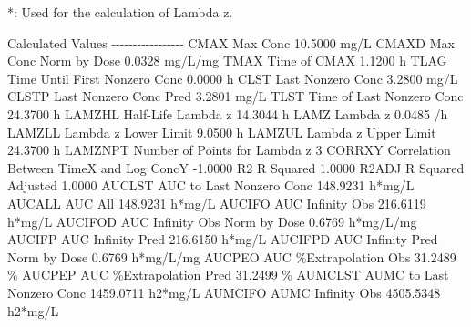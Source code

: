 \documentclass[
  10pt,
]{krantz}
\makeatletter
\newenvironment{Shaded}{\begin{snugshade}}{\end{snugshade}}
\newcommand{\ExtensionTok}[1]{#1}
\newcommand{\NormalTok}[1]{#1}
\newenvironment{kframe}{%
\medskip{}
\setlength{\fboxsep}{.8em}
 \def\at@end@of@kframe{}%
 \ifinner\ifhmode%
  \def\at@end@of@kframe{\end{minipage}}%
  \begin{minipage}{\columnwidth}%
 \fi\fi%
 \def\FrameCommand##1{\hskip\@totalleftmargin \hskip-\fboxsep
 \colorbox{shadecolor}{##1}\hskip-\fboxsep
     \hskip-\linewidth \hskip-\@totalleftmargin \hskip\columnwidth}%
 \MakeFramed {\advance\hsize-\width
   \@totalleftmargin\z@ \linewidth\hsize
   \@setminipage}}%
 {\par\unskip\endMakeFramed%
 \at@end@of@kframe}
\renewenvironment{Shaded}{\begin{kframe}}{\end{kframe}}
\makeatother
\begin{document}
\begin{Shaded}
\begin{Highlighting}[]
\ExtensionTok{*}\NormalTok{: Used for the calculation of Lambda z.}


\ExtensionTok{Calculated}\NormalTok{ Values}
\ExtensionTok{{-}{-}{-}{-}{-}{-}{-}{-}{-}{-}{-}{-}{-}{-}{-}{-}{-}}
\ExtensionTok{CMAX}\NormalTok{       Max Conc                                       10.5000 mg/L}
\ExtensionTok{CMAXD}\NormalTok{      Max Conc Norm by Dose                           0.0328 mg/L/mg}
\ExtensionTok{TMAX}\NormalTok{       Time of CMAX                                    1.1200 h}
\ExtensionTok{TLAG}\NormalTok{       Time Until First Nonzero Conc                   0.0000 h}
\ExtensionTok{CLST}\NormalTok{       Last Nonzero Conc                               3.2800 mg/L}
\ExtensionTok{CLSTP}\NormalTok{      Last Nonzero Conc Pred                          3.2801 mg/L}
\ExtensionTok{TLST}\NormalTok{       Time of Last Nonzero Conc                      24.3700 h}
\ExtensionTok{LAMZHL}\NormalTok{     Half{-}Life Lambda z                             14.3044 h}
\ExtensionTok{LAMZ}\NormalTok{       Lambda z                                        0.0485 /h}
\ExtensionTok{LAMZLL}\NormalTok{     Lambda z Lower Limit                            9.0500 h}
\ExtensionTok{LAMZUL}\NormalTok{     Lambda z Upper Limit                           24.3700 h}
\ExtensionTok{LAMZNPT}\NormalTok{    Number of Points for Lambda z                   3}
\ExtensionTok{CORRXY}\NormalTok{     Correlation Between TimeX and Log ConcY        {-}1.0000 }
\ExtensionTok{R2}\NormalTok{         R Squared                                       1.0000 }
\ExtensionTok{R2ADJ}\NormalTok{      R Squared Adjusted                              1.0000 }
\ExtensionTok{AUCLST}\NormalTok{     AUC to Last Nonzero Conc                      148.9231 h*mg/L}
\ExtensionTok{AUCALL}\NormalTok{     AUC All                                       148.9231 h*mg/L}
\ExtensionTok{AUCIFO}\NormalTok{     AUC Infinity Obs                              216.6119 h*mg/L}
\ExtensionTok{AUCIFOD}\NormalTok{    AUC Infinity Obs Norm by Dose                   0.6769 h*mg/L/mg}
\ExtensionTok{AUCIFP}\NormalTok{     AUC Infinity Pred                             216.6150 h*mg/L}
\ExtensionTok{AUCIFPD}\NormalTok{    AUC Infinity Pred Norm by Dose                  0.6769 h*mg/L/mg}
\ExtensionTok{AUCPEO}\NormalTok{     AUC \%Extrapolation Obs                         31.2489 \%}
\ExtensionTok{AUCPEP}\NormalTok{     AUC \%Extrapolation Pred                        31.2499 \%}
\ExtensionTok{AUMCLST}\NormalTok{    AUMC to Last Nonzero Conc                    1459.0711 h2*mg/L}
\ExtensionTok{AUMCIFO}\NormalTok{    AUMC Infinity Obs                            4505.5348 h2*mg/L}

\end{Highlighting}
\end{Shaded}
\end{document}
